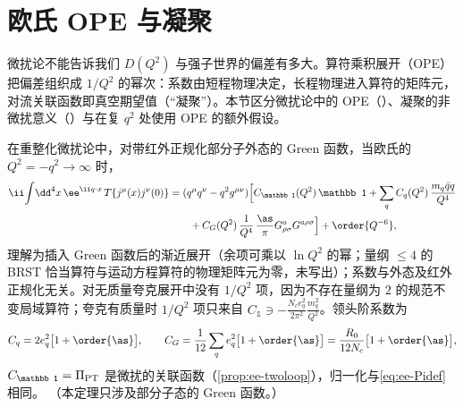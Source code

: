 \section{欧氏 OPE 与凝聚}\label{sec:ee-ope}

微扰论不能告诉我们 $D(Q^2)$ 与强子世界的偏差有多大。算符乘积展开（OPE）把偏差组织成 $1/Q^2$ 的幂次：系数由短程物理决定，长程物理进入算符的矩阵元，对流关联函数即真空期望值（“凝聚”）。本节区分微扰论中的 OPE（\tagA）、凝聚的非微扰意义（\tagC）与在复 $q^2$ 处使用 OPE 的额外假设。

\begin{theorem}\label{thm:ee-ope}
在重整化微扰论中，对带红外正规化部分子外态的 Green 函数，当欧氏的 $Q^2=-q^2\to\infty$ 时，
\begin{equation}\label{eq:ee-ope}
\begin{split}
\ii\!\int\!\dd^4x\,\ee^{\ii q\cdot x}\,T\{j^\mu(x)j^\nu(0)\}&=(q^\mu q^\nu-q^2g^{\mu\nu})\Big[C_{\mathbb 1}(Q^2)\,\mathbb 1+\sum_qC_q(Q^2)\,\frac{m_q\bar qq}{Q^4}\\
&\qquad+C_G(Q^2)\,\frac{1}{Q^4}\,\frac{\as}\pi G^a_{\rho\sigma}G^{a\rho\sigma}\Big]+\order{Q^{-6}},
\end{split}
\end{equation}
理解为插入 Green 函数后的渐近展开（余项可乘以 $\ln Q^2$ 的幂；量纲 $\le4$ 的 BRST 恰当算符与运动方程算符的物理矩阵元为零，未写出）；系数与外态及红外正规化无关。对无质量夸克展开中没有 $1/Q^2$ 项，因为不存在量纲为 $2$ 的规范不变局域算符；夸克有质量时 $1/Q^2$ 项只来自 $C_{\mathbb 1}\ni-\frac{N_ce_q^2}{2\pi^2}\frac{m_q^2}{Q^2}$。领头阶系数为
\begin{equation}\label{eq:ee-ope-coeff}
C_q=2e_q^2\big[1+\order{\as}\big],\qquad C_G=\frac1{12}\sum_qe_q^2\big[1+\order{\as}\big]=\frac{R_0}{12N_c}\big[1+\order{\as}\big],
\end{equation}
$C_{\mathbb 1}=\Pi_{\rm PT}$ 是微扰的关联函数（\cref{prop:ee-twoloop}），归一化与\cref{eq:ee-Pidef}相同。%
（本定理只涉及部分子态的 Green 函数。）
\end{theorem}
